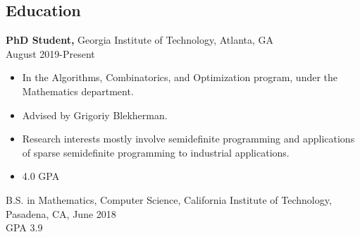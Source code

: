 \documentclass[margin]{res}
\begin{document}
 
 

 
\address{{\bf Present Address} \\ 1000 Northside Dr NW \\ Apt 1314  \\ Atlanta, GA 30318  \\
        (626) 399-3716 }
\address{{\bf Permanent Address} \\ 84 Cheesespring Road \\ Wilton, CT 06897}

 
\begin{resume} 

\section{Education} 
 {\bf PhD Student,} Georgia Institute of Technology, Atlanta, GA\\ August 2019-Present
 \begin{itemize} \itemsep -2pt  %
 \item In the Algorithms, Combinatorics, and Optimization program, under the Mathematics department.
 \item Advised by Grigoriy Blekherman.
 \item Research interests mostly involve semidefinite programming and applications of sparse semidefinite programming to industrial applications.
 \item 4.0 GPA
 \end{itemize}

B.S. in Mathematics, Computer Science, California Institute of Technology, Pasadena, CA, June 2018 \\
GPA 3.9


\end{resume}
\end{document}
